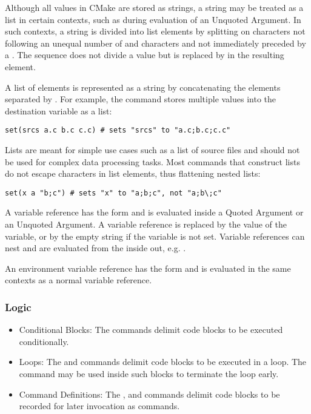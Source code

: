 Although all values in CMake are stored as strings, a string may be treated as a list in certain contexts, such as during evaluation of an Unquoted Argument. In such contexts, a string is divided into list elements by splitting on \inlinecode{;} characters not following an unequal number of \inlinecode{[} and \inlinecode{]} characters and not immediately preceded by a \inlinecode{\\}. The sequence \inlinecode{\\;} does not divide a value but is replaced by \inlinecode{;} in the resulting element.

A list of elements is represented as a string by concatenating the elements separated by \inlinecode{;}. For example, the  command stores multiple values into the destination variable as a list:
\begin{lstlisting}
set(srcs a.c b.c c.c) # sets "srcs" to "a.c;b.c;c.c"
\end{lstlisting}
Lists are meant for simple use cases such as a list of source files and should not be used for complex data processing tasks. Most commands that construct lists do not escape \inlinecode{;} characters in list elements, thus flattening nested lists:
\begin{lstlisting}
set(x a "b;c") # sets "x" to "a;b;c", not "a;b\;c"
\end{lstlisting}


A variable reference has the form  and is evaluated inside a Quoted Argument or an Unquoted Argument. A variable reference is replaced by the value of the variable, or by the empty string if the variable is not set. Variable references can nest and are evaluated from the inside out, e.g. .

An environment variable reference has the form  and is evaluated in the same contexts as a normal variable reference.

\subsubsection{Logic}
\begin{itemize}
    \item Conditional Blocks: The  commands delimit code blocks to be executed conditionally.
    \item Loops: The  and  commands delimit code blocks to be executed in a loop. The  command may be used inside such blocks to terminate the loop early.
    \item Command Definitions: The , and  commands delimit code blocks to be recorded for later invocation as commands.
\end{itemize}


